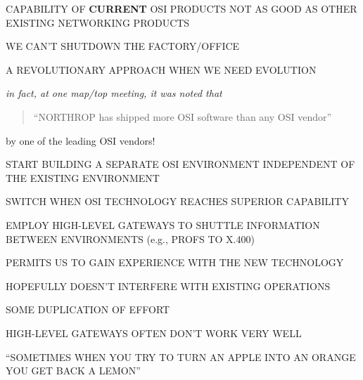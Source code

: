 \begin{bwslide}

\begin{nrtc}
\item	CAPABILITY OF {\bf CURRENT\/} OSI PRODUCTS
	NOT AS GOOD AS OTHER EXISTING NETWORKING PRODUCTS
    
\item	WE CAN'T SHUTDOWN THE FACTORY/OFFICE

\item	A REVOLUTIONARY APPROACH WHEN WE NEED EVOLUTION
\end{nrtc}
\end{bwslide}


\begin{note}\em
in fact, at one map/top meeting, it was noted that

\begin{quote}
``NORTHROP has shipped more OSI software than any OSI vendor''
\end{quote}

by one of the leading OSI vendors!
\end{note}


\begin{bwslide}

\begin{nrtc}
\item	START BUILDING A SEPARATE OSI ENVIRONMENT INDEPENDENT OF THE EXISTING
	ENVIRONMENT

\item	SWITCH WHEN OSI TECHNOLOGY REACHES SUPERIOR CAPABILITY

\item	EMPLOY HIGH-LEVEL GATEWAYS TO SHUTTLE INFORMATION BETWEEN ENVIRONMENTS
	(e.g., PROFS TO X.400)
\end{nrtc}
\end{bwslide}


\begin{bwslide}
\end{bwslide}


\begin{bwslide}

\begin{nrtc}
\item	PERMITS US TO GAIN EXPERIENCE WITH THE NEW TECHNOLOGY

\item	HOPEFULLY DOESN'T INTERFERE WITH EXISTING OPERATIONS

\item	SOME DUPLICATION OF EFFORT
    
\item	HIGH-LEVEL GATEWAYS OFTEN DON'T WORK VERY WELL
    \begin{nrtc}
    \item	``SOMETIMES WHEN YOU TRY TO TURN AN APPLE INTO AN ORANGE YOU
		GET BACK A LEMON''
    \end{nrtc}
\end{nrtc}
\end{bwslide}


